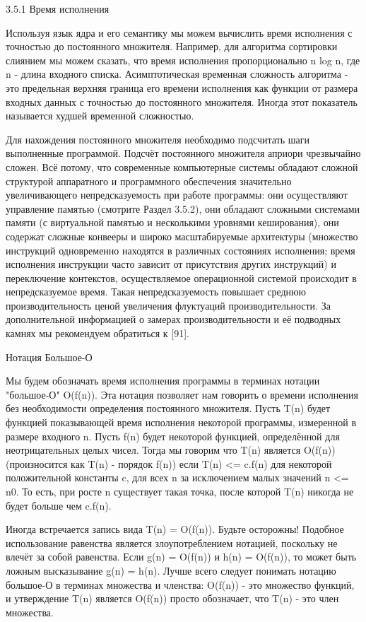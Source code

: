 3.5.1 Время исполнения

Используя язык ядра и его семантику мы можем вычислить время исполнения с точностью до постоянного множителя. Например, для алгоритма сортировки слиянием мы можем сказать, что время исполнения пропорционально n log n, где n - длина входного списка. Асимптотическая временная сложность алгоритма - это предельная верхняя граница его времени исполнения как функции от размера входных данных с точностью до постоянного множителя. Иногда этот показатель называется худшей временной сложностью.

Для нахождения постоянного множителя необходимо подсчитать шаги выполненные программой. Подсчёт постоянного множителя априори чрезвычайно сложен. Всё потому, что современные компьютерные системы обладают сложной структурой аппаратного и программного обеспечения значительно увеличивающего непредсказуемость при работе программы: они осуществляют управление памятью (смотрите Раздел 3.5.2), они обладают сложными системами памяти (с виртуальной памятью и несколькими уровнями кеширования), они содержат сложные конвееры и широко масштабируемые архитектуры (множество инструкций одновременно находятся в различных состояниях исполнения; время исполнения инструкции часто зависит от присутствия других инструкций) и переключение контекстов, осуществляемое операционной системой происходит в непредсказуемое время. Такая непредсказуемость повышает среднюю производительность ценой увеличения флуктуаций производительности. За дополнительной информацией о замерах производительности и её подводных камнях мы рекомендуем обратиться к [91].

Нотация Большое-О

Мы будем обозначать время исполнения программы в терминах нотации "большое-О" O(f(n)). Эта нотация позволяет нам говорить о времени исполнения без необходимости определения постоянного множителя. Пусть T(n) будет функцией показывающей время исполнения некоторой программы, измеренной в размере входного n. Пусть f(n) будет некоторой функцией, определённой для неотрицательных целых чисел. Тогда мы говорим что T(n) является O(f(n)) (произносится как T(n) - порядок f(n)) если T(n) <= c.f(n) для некоторой положительной константы c, для всех n за исключением малых значений n <= n0. То есть, при росте n существует такая точка, после которой T(n) никогда не будет больше чем c.f(n).

Иногда встречается запись вида T(n) = O(f(n)). Будьте осторожны! Подобное использование равенства является злоупотреблением нотацией, поскольку не влечёт за собой равенства. Если g(n) = O(f(n)) и h(n) = O(f(n)), то может быть ложным высказывание g(n) = h(n). Лучше всего следует понимать нотацию большое-О в терминах множества и членства: O(f(n)) - это множество функций, и утверждение T(n) является O(f(n)) просто обозначает, что T(n) - это член множества.

